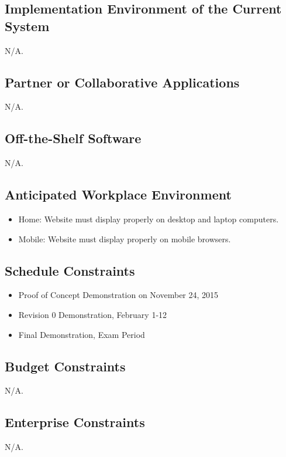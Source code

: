 \documentclass[12pt]{article}
\begin{document}
\subsection{Implementation Environment of the Current System}
N/A.

\subsection{Partner or Collaborative Applications} 
N/A.
    
\subsection{Off-the-Shelf Software} 
N/A.
    
\subsection{Anticipated Workplace Environment} 
    \begin{itemize}
    \item Home: Website must display properly on desktop and laptop computers.
    \item Mobile: Website must display properly on mobile browsers. 
    \end{itemize}
    
\subsection{Schedule Constraints} 
    \begin{itemize}
    \item Proof of Concept Demonstration on November 24, 2015
    \item Revision 0 Demonstration, February 1-12
    \item Final Demonstration, Exam Period
    \end{itemize}
    
\subsection{Budget Constraints}
    N/A.
    
\subsection{Enterprise Constraints}
    N/A.
\end{document}
